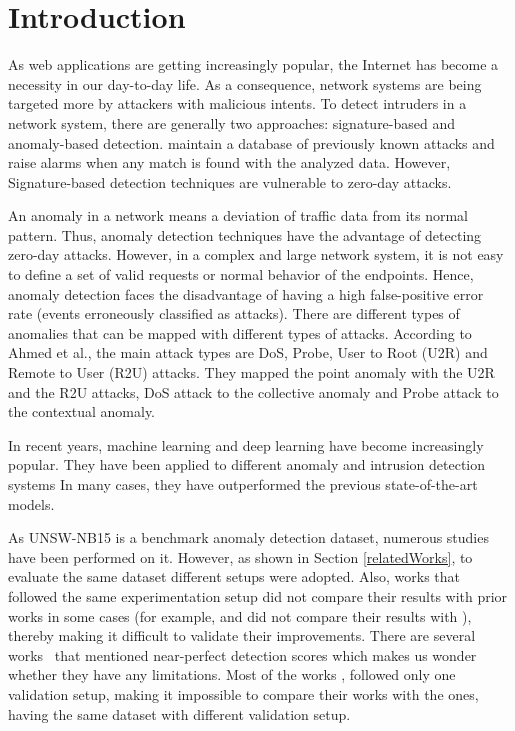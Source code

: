 \documentclass[14pt, conference]{IEEEtran}
\begin{document}
\section{Introduction}
As web applications are getting increasingly popular, the Internet has become a necessity in our day-to-day life. As a
consequence, network systems are being targeted more by attackers with malicious intents. To detect intruders in a
network system, there are generally two approaches: signature-based and anomaly-based detection.  maintain a database of previously known attacks and raise alarms when any match is found with the analyzed
 data. However, Signature-based
detection techniques  are vulnerable to zero-day attacks.

An anomaly in a network means a deviation of traffic data from its normal pattern. Thus, anomaly detection techniques
have the advantage of detecting zero-day attacks. However, in a complex and large network system,  it is not easy to define a set of valid requests or normal behavior of the endpoints. Hence, anomaly detection faces the disadvantage of
having a high false-positive error rate (events erroneously classified as attacks). There are different types of anomalies that can be mapped with different types of attacks. According to Ahmed et al.\cite{ahmed2016survey},
the main attack types are DoS, Probe, User to Root (U2R) and Remote to User (R2U) attacks. They\cite{ahmed2016survey} mapped the point
anomaly with the U2R and the R2U attacks, DoS attack to the collective anomaly and Probe attack to the contextual anomaly.

In recent years, machine learning and deep learning have become increasingly popular. They have been applied to
different anomaly and intrusion detection systems %
In many cases, they have outperformed the previous state-of-the-art models.

As UNSW-NB15\cite{moustafa2015unsw} is a benchmark anomaly detection dataset, numerous studies have been performed on it.
However, as shown in Section \ref{relatedWorks}, to evaluate the same dataset different setups were adopted.
Also, works that followed the same experimentation setup did not compare their results with prior works in some cases (for example, \cite{Kanimozhi2019UNSW-NB15} and  \cite{nawir2019effective} did not compare their results with \cite{koroniotis2017towards}), thereby making it difficult to validate their improvements. There are several works~
\cite{Kanimozhi2019UNSW-NB15} that mentioned near-perfect detection scores which makes us wonder whether they have any limitations. Most of the works \cite{nawir2019effective} \cite{Kanimozhi2019UNSW-NB15}, \cite{meghdouri2018analysis}  followed only one validation setup, making it impossible to compare their works with the ones, having the same dataset with different validation setup.
\end{document}

